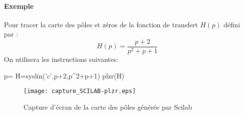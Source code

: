 \paragraph{Exemple}
Pour tracer la carte des pôles et zéros de la fonction de transfert $H(p)$ 
défini par :
\[
H(p)=\dfrac{p+2}{p^2+p+1}
\]
On utilisera les instructions suivantes:
\begin{Scilabcode}
p=%
H=syslin('c',p+2,p^2+p+1)
plzr(H)
\end{Scilabcode}
\begin{figure}[!b]
    \centering
    \texttt{[image: capture\_SCILAB-plzr.eps]}
    \caption{Capture d'écran de la carte des pôles générée par Scilab}
\end{figure}
\clearpage
